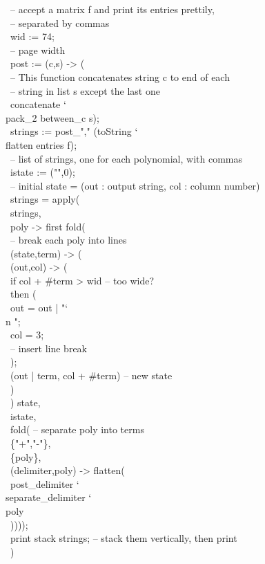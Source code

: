 \          -- accept a matrix f and print its entries prettily,\\
\          -- separated by commas\\
\          wid := 74;\\
\          -- page width\\
\          post := (c,s) -> (\\
\             -- This function concatenates string c to end of each\\
\             -- string in list s except the last one\\
\             concatenate {\char`\\} pack_2 between_c s);\\
\          strings := post_"," (toString {\char`\\} flatten entries f);\\
\          -- list of strings, one for each polynomial, with commas\\
\          istate := ("",0);\\
\          -- initial state = (out : output string, col : column number)\\
\          strings = apply(\\
\             strings,\\
\             poly -> first fold(\\
\                -- break each poly into lines\\
\                (state,term) -> (\\
\                   (out,col) -> (\\
\                      if col + #term > wid -- too wide?\\
\                      then (\\
\                         out = out | "{\char`\\}n   "; \\
\                         col = 3;\\
\                         -- insert line break\\
\                         );\\
\                      (out | term, col + #term) -- new state\\
\                      )\\
\                   ) state,\\
\                istate,\\
\                fold( -- separate poly into terms \\
\                   \{"+","-"\},\\
\                   \{poly\},\\
\                   (delimiter,poly) -> flatten( \\
\                      post_delimiter {\char`\\} separate_delimiter {\char`\\} poly\\
\                      ))));\\
\          print stack strings;  -- stack them vertically, then print\\
\          )\\
\endOutput

